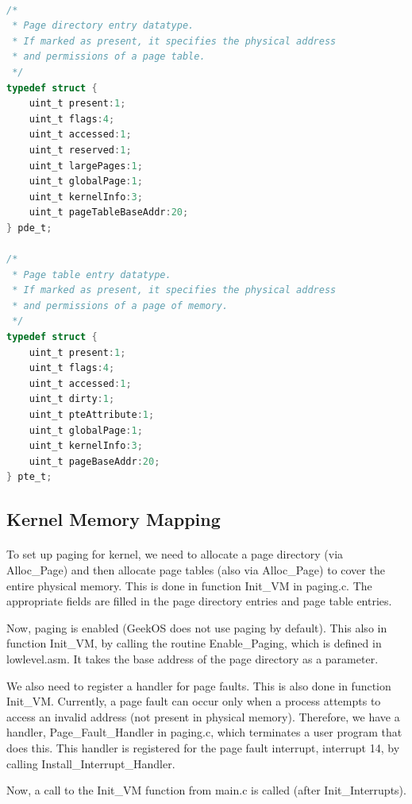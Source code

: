 \documentclass[11pt]{article}
\begin{document}
\begin{lstlisting}[language=c]

/*
 * Page directory entry datatype.
 * If marked as present, it specifies the physical address
 * and permissions of a page table.
 */
typedef struct {
    uint_t present:1;
    uint_t flags:4;
    uint_t accessed:1;
    uint_t reserved:1;
    uint_t largePages:1;
    uint_t globalPage:1;
    uint_t kernelInfo:3;
    uint_t pageTableBaseAddr:20;
} pde_t;

/*
 * Page table entry datatype.
 * If marked as present, it specifies the physical address
 * and permissions of a page of memory.
 */
typedef struct {
    uint_t present:1;
    uint_t flags:4;
    uint_t accessed:1;
    uint_t dirty:1;
    uint_t pteAttribute:1;
    uint_t globalPage:1;
    uint_t kernelInfo:3;
    uint_t pageBaseAddr:20;
} pte_t;


\end{lstlisting}

\subsection{Kernel Memory Mapping}
\paragraph{}

To set up paging for kernel, we need to allocate a page directory (via Alloc\_Page) and then allocate page tables (also via Alloc\_Page) to cover the entire physical memory. This is done in function Init\_VM in paging.c. The appropriate fields are filled in the page directory entries and page table entries. 

Now, paging is enabled (GeekOS does not use paging by default). This also in function Init\_VM, by calling the routine Enable\_Paging, which is defined in lowlevel.asm. It takes the base address of the page directory as a parameter.

We also need to register a handler for page faults. This is also done in function Init\_VM. Currently, a page fault can occur only when a process attempts to access an invalid address (not present in physical memory). Therefore, we have a handler, Page\_Fault\_Handler in paging.c, which terminates a user program that does this. This handler is registered for the page fault interrupt, interrupt 14, by calling Install\_Interrupt\_Handler.

Now, a call to the Init\_VM function from main.c is called (after Init\_Interrupts).
\end{document}
